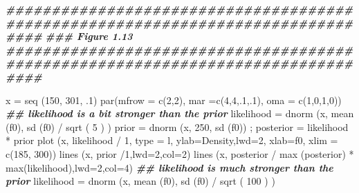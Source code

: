 \documentclass[
]{book}
\newenvironment{Shaded}{\begin{snugshade}}{\end{snugshade}}
\newcommand{\AttributeTok}[1]{\textcolor[rgb]{0.77,0.63,0.00}{#1}}
\newcommand{\DecValTok}[1]{\textcolor[rgb]{0.00,0.00,0.81}{#1}}
\newcommand{\DocumentationTok}[1]{\textcolor[rgb]{0.56,0.35,0.01}{\textbf{\textit{#1}}}}
\newcommand{\FunctionTok}[1]{\textcolor[rgb]{0.00,0.00,0.00}{#1}}
\newcommand{\NormalTok}[1]{#1}
\newcommand{\OtherTok}[1]{\textcolor[rgb]{0.56,0.35,0.01}{#1}}
\newcommand{\SpecialCharTok}[1]{\textcolor[rgb]{0.00,0.00,0.00}{#1}}
\newcommand{\StringTok}[1]{\textcolor[rgb]{0.31,0.60,0.02}{#1}}
\begin{document}
\begin{Shaded}
\begin{Highlighting}[]
\DocumentationTok{\#\#\#\#\#\#\#\#\#\#\#\#\#\#\#\#\#\#\#\#\#\#\#\#\#\#\#\#\#\#\#\#\#\#\#\#\#\#\#\#\#\#\#\#\#\#\#\#\#\#\#\#\#\#\#\#\#\#\#\#\#\#\#\#\#\#\#\#\#\#\#\#\#\#\#\#\#\#\#\#}
\DocumentationTok{\#\#\# Figure 1.13}
\DocumentationTok{\#\#\#\#\#\#\#\#\#\#\#\#\#\#\#\#\#\#\#\#\#\#\#\#\#\#\#\#\#\#\#\#\#\#\#\#\#\#\#\#\#\#\#\#\#\#\#\#\#\#\#\#\#\#\#\#\#\#\#\#\#\#\#\#\#\#\#\#\#\#\#\#\#\#\#\#\#\#\#\#}

\NormalTok{x }\OtherTok{=} \FunctionTok{seq}\NormalTok{ (}\DecValTok{150}\NormalTok{, }\DecValTok{301}\NormalTok{, .}\DecValTok{1}\NormalTok{)}
\FunctionTok{par}\NormalTok{(}\AttributeTok{mfrow =} \FunctionTok{c}\NormalTok{(}\DecValTok{2}\NormalTok{,}\DecValTok{2}\NormalTok{), }\AttributeTok{mar =}\FunctionTok{c}\NormalTok{(}\DecValTok{4}\NormalTok{,}\DecValTok{4}\NormalTok{,.}\DecValTok{1}\NormalTok{,.}\DecValTok{1}\NormalTok{), }\AttributeTok{oma =} \FunctionTok{c}\NormalTok{(}\DecValTok{1}\NormalTok{,}\DecValTok{0}\NormalTok{,}\DecValTok{1}\NormalTok{,}\DecValTok{0}\NormalTok{))  }
\DocumentationTok{\#\# likelihood is a bit stronger than the prior}
\NormalTok{likelihood }\OtherTok{=} \FunctionTok{dnorm}\NormalTok{ (x, }\FunctionTok{mean}\NormalTok{ (f0), }\FunctionTok{sd}\NormalTok{ (f0) }\SpecialCharTok{/} \FunctionTok{sqrt}\NormalTok{ ( }\DecValTok{5}\NormalTok{ ) )}
\NormalTok{prior }\OtherTok{=} \FunctionTok{dnorm}\NormalTok{ (x, }\DecValTok{250}\NormalTok{, }\FunctionTok{sd}\NormalTok{ (f0)) ; posterior }\OtherTok{=}\NormalTok{ likelihood }\SpecialCharTok{*}\NormalTok{ prior}
\FunctionTok{plot}\NormalTok{ (x, likelihood }\SpecialCharTok{/} \DecValTok{1}\NormalTok{, }\AttributeTok{type =} \StringTok{\textquotesingle{}l\textquotesingle{}}\NormalTok{, }\AttributeTok{ylab=}\StringTok{\textquotesingle{}Density\textquotesingle{}}\NormalTok{,}\AttributeTok{lwd=}\DecValTok{2}\NormalTok{, }\AttributeTok{xlab=}\StringTok{\textquotesingle{}f0\textquotesingle{}}\NormalTok{,}
      \AttributeTok{xlim =} \FunctionTok{c}\NormalTok{(}\DecValTok{185}\NormalTok{, }\DecValTok{300}\NormalTok{))}
\FunctionTok{lines}\NormalTok{ (x, prior }\SpecialCharTok{/}\DecValTok{1}\NormalTok{,}\AttributeTok{lwd=}\DecValTok{2}\NormalTok{,}\AttributeTok{col=}\DecValTok{2}\NormalTok{)}
\FunctionTok{lines}\NormalTok{ (x, posterior }\SpecialCharTok{/} \FunctionTok{max}\NormalTok{ (posterior) }\SpecialCharTok{*} \FunctionTok{max}\NormalTok{(likelihood),}\AttributeTok{lwd=}\DecValTok{2}\NormalTok{,}\AttributeTok{col=}\DecValTok{4}\NormalTok{)}
\DocumentationTok{\#\# likelihood is much stronger than the prior}
\NormalTok{likelihood }\OtherTok{=} \FunctionTok{dnorm}\NormalTok{ (x, }\FunctionTok{mean}\NormalTok{ (f0), }\FunctionTok{sd}\NormalTok{ (f0) }\SpecialCharTok{/} \FunctionTok{sqrt}\NormalTok{ ( }\DecValTok{100}\NormalTok{ ) )}

\end{Highlighting}
\end{Shaded}
\end{document}
